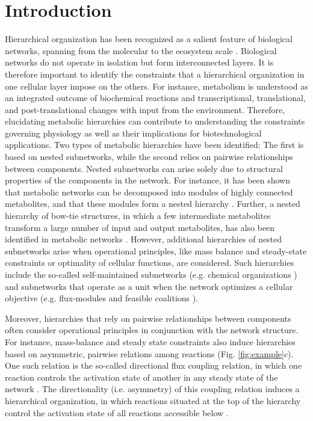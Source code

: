 \documentclass[12pt]{article}
\begin{document}
\section{Introduction}
Hierarchical organization has been recognized as a salient feature of biological networks, spanning from the molecular to the ecosystem scale \cite{Miller2008,Erwin2009,Mengistu2016,Meunier2010,Ravasz2002,Yu2006}. Biological networks do not operate in isolation but form interconnected layers. It is therefore important to identify the constraints that a hierarchical organization in one cellular layer impose on the others. For instance, metabolism is understood as an integrated outcome of biochemical reactions and transcriptional, translational, and post-translational changes with input from the environment. Therefore, elucidating metabolic hierarchies can contribute to understanding the constraints governing physiology as well as their implications for biotechnological applications.
Two types of metabolic hierarchies have been identified: The first is based on nested subnetworks, while the second relies on pairwise relationships between components. Nested subnetworks can arise solely due to structural properties of the components in the network. For instance, it has been shown that metabolic networks can be decomposed into modules of highly connected metabolites, and that these modules form a nested hierarchy \cite{Ravasz2002,Matthaus2008}. Further, a nested hierarchy of bow-tie structures, in which a few intermediate metabolites transform a large number of input and output metabolites, has also been identified in metabolic networks \cite{Zhao2006}. However, additional hierarchies of nested subnetworks arise when operational principles, like mass balance and steady-state constraints or optimality of cellular functions, are considered. Such hierarchies include the so-called self-maintained subnetworks (e.g. chemical organizations \cite{Dittrich2007,Fontana1994}) and subnetworks that operate as a unit when the network optimizes a cellular objective (e.g. flux-modules \cite{Kelk2012,Muller2014a,Reimers2015b} and feasible coalitions \cite{Sajitz-Hermstein2012}).

Moreover, hierarchies that rely on pairwise relationships between components often consider operational principles in conjunction with the network structure. For instance, mass-balance and steady state constraints also induce hierarchies based on asymmetric, pairwise relations among reactions (Fig. \ref{fig:example}c). One such relation is the so-called directional flux coupling relation, in which one reaction controls the activation state of another in any steady state of the network \cite{Burgard2004a}. The directionality (i.e. asymmetry) of this coupling relation induces a hierarchical organization, in which reactions situated at the top of the hierarchy control the activation state of all reactions accessible below \cite{Hosseini2015}.
\end{document}
